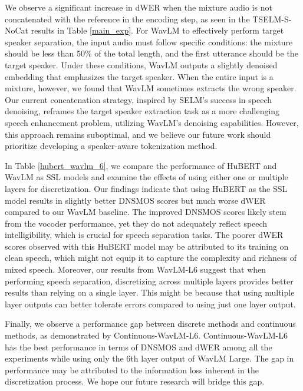 \documentclass[conference]{IEEEtran}
\begin{document}
We observe a significant increase in dWER when the mixture audio is not concatenated with the reference in the encoding step, as seen in the TSELM-S-NoCat results in Table \ref{main_exp}. For WavLM to effectively perform target speaker separation, the input audio must follow specific conditions: the mixture should be less than 50\% of the total length, and the first utterance should be the target speaker. Under these conditions, WavLM outputs a slightly denoised embedding that emphasizes the target speaker. When the entire input is a mixture, however, we found that WavLM sometimes extracts the wrong speaker.
Our current concatenation strategy, inspired by SELM's \cite{selm} success in speech denoising, reframes the target speaker extraction task as a more challenging speech enhancement problem, utilizing WavLM's denoising capabilities. However, this approach remains suboptimal, and we believe our future work should prioritize developing a speaker-aware tokenization method. 

In Table \ref{hubert_wavlm_6}, we compare the performance of HuBERT and WavLM as SSL models and examine the effects of using either one or multiple layers for discretization. Our findings indicate that using HuBERT as the SSL model results in slightly better DNSMOS scores but much worse dWER compared to our WavLM baseline. The improved DNSMOS scores likely stem from the vocoder performance, yet they do not adequately reflect speech intelligibility, which is crucial for speech separation tasks.
The poorer dWER scores observed with this HuBERT model may be attributed to its training on clean speech, which might not equip it to capture the complexity and richness of mixed speech. Moreover, our results from WavLM-L6 suggest that when performing speech separation, discretizing across multiple layers provides better results than relying on a single layer.  This might be because that using multiple layer outputs can better tolerate errors compared to using just one layer output.

Finally, we observe a performance gap between discrete methods and continuous methods, as demonstrated by Continuous-WavLM-L6.
Continuous-WavLM-L6 has the best performance in terms of DNSMOS and dWER among all the experiments while using only the 6th layer output of WavLM Large. 
The gap in performance may be attributed to the information loss inherent in the discretization process. 
We hope our future research will bridge this gap.   
\end{document}
